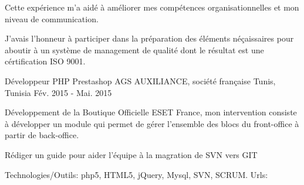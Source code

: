 \begin{cventries}
{\begin{cvitems}
        \item {Cette expérience m'a aidé à améliorer mes compétences organisationnelles et mon niveau de communication.}
        \item {J'avais l'honneur à participer dans la préparation des éléments néçaissaires pour aboutir à un système de management de qualité dont le résultat est une cértification ISO 9001.}
      \end{cvitems}
    }
    {}{}{}
  \techentries
    {Développeur PHP Prestashop}
    {AGS AUXILIANCE, société française}
    {Tunis, Tunisia}
    {Fév. 2015 - Mai. 2015}
    {
      \begin{cvitems}
        \item {Développement de la Boutique Officielle ESET France, mon intervention consiste à développer un module qui permet  de gérer l'ensemble des blocs du front-office à partir de back-office.}
        \item {Rédiger un guide pour aider l'équipe à la magration de SVN vers GIT}
      \end{cvitems}
    }
    {\textcolor{awesome}{Technologies/Outils: } {\color{graytext}}  {php5, HTML5, jQuery, Mysql, SVN, SCRUM.}}
    {Urls:} 
    {\href{https://www.boutique-eset.com/}{} \break}
    { }\break
\end{cventries}